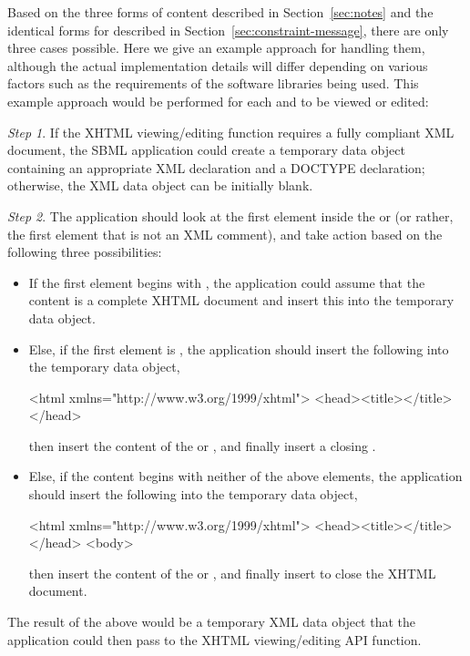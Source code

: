 Based on the three forms of \SBase {} content described in
Section~\ref{sec:notes} and the identical forms for
\Constraint {} described in Section~\ref{sec:constraint-message},
there are only three cases possible.
Here we give an example approach for handling them, although the
actual implementation details will differ depending on various
factors such as the requirements of the software libraries being
used.  This example approach would be performed for each
 and  to be viewed or edited:
\begin{description}
  
\item \emph{Step 1}. If the XHTML viewing/editing function
  requires a fully compliant XML document, the SBML application
  could create a temporary data object containing an appropriate
  XML declaration and a DOCTYPE declaration; otherwise, the XML
  data object can be initially blank.
  
\item \emph{Step 2}. The application should look at the first
  element inside the  or 
  (or rather, the first element
  that is not an XML comment), and take action based on the
  following three possibilities:
  \begin{itemize}\setlength{\parskip}{1.5ex}
    
  \item If the first element begins with
    , the
    application could assume that the content is a complete XHTML
    document and insert this into the temporary data object.
    
  \item Else, if the first element is , the
    application should insert the following into the temporary
    data object, 

    \begin{example}
<html xmlns="http://www.w3.org/1999/xhtml">
    <head><title></title></head>\end{example}
    then insert the content of the  
    or , and finally
    insert a closing .
    
  \item Else, if the content begins with neither of
    the above elements, the application should insert the
    following into the temporary data object,

    \begin{example}
<html xmlns="http://www.w3.org/1999/xhtml">
    <head><title></title></head>
    <body>\end{example}
    then insert the content of the  or , and finally
    insert  to close the XHTML document.
  \end{itemize}

\end{description}
The result of the above would be a temporary XML data object that
the application could then pass to the XHTML viewing/editing API
function.

